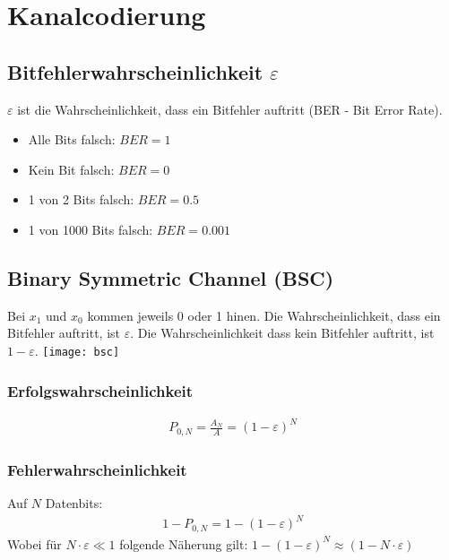 \section{Kanalcodierung}
\subsection{Bitfehlerwahrscheinlichkeit $\varepsilon$}
 $\varepsilon$ ist die Wahrscheinlichkeit, dass ein Bitfehler auftritt (BER - Bit Error Rate).
\begin{itemize}
    \item Alle Bits falsch: $BER = 1$
    \item Kein Bit falsch: $BER = 0$
    \item 1 von 2 Bits falsch: $BER = 0.5$
    \item 1 von 1000 Bits falsch: $BER = 0.001$
\end{itemize}
\subsection{Binary Symmetric Channel (BSC)}
Bei $x_1$ und $x_0$ kommen jeweils 0 oder 1 hinen. Die Wahrscheinlichkeit, dass ein Bitfehler auftritt, ist $\varepsilon$.
Die Wahrscheinlichkeit dass kein Bitfehler auftritt, ist $1 - \varepsilon$.
\texttt{[image: bsc]}
\subsubsection{Erfolgswahrscheinlichkeit}
\begin{align*}
    P_{0,N} = \frac{A_N}{A} = (1 - \varepsilon)^N
\end{align*}
\subsubsection{Fehlerwahrscheinlichkeit}
Auf $N$ Datenbits:
\begin{align*}
    1 - P_{0,N} = 1 - (1 - \varepsilon)^N
\end{align*}
Wobei für $N \cdot \varepsilon \ll 1$ folgende Näherung gilt: $1 - (1 - \varepsilon)^N \approx ( 1 - N \cdot \varepsilon)$
